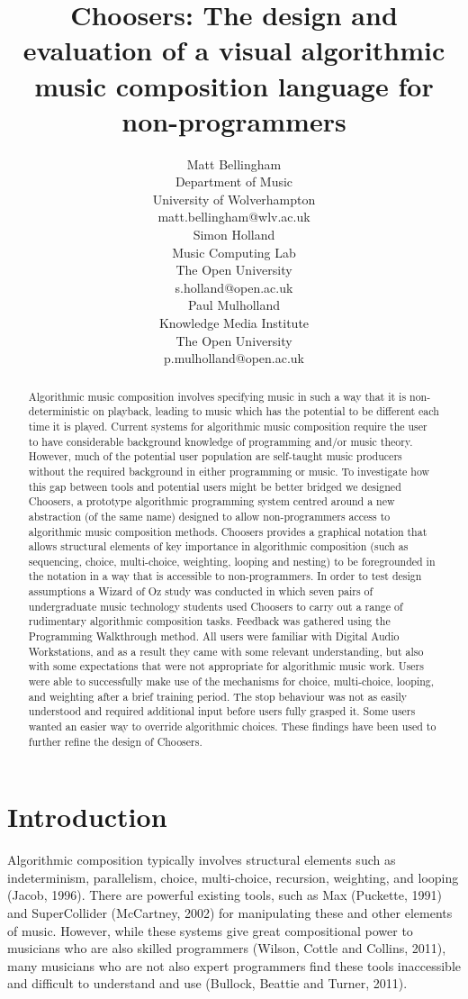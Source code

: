 \documentclass{ppig}
\title{Choosers: The design and evaluation of a visual algorithmic music
composition language for non-programmers}
\author{Matt Bellingham \\
  Department of Music \\
  University of Wolverhampton \\
  matt.bellingham@wlv.ac.uk \\
  \And
  Simon Holland \\
  Music Computing Lab \\
  The Open University \\
  s.holland@open.ac.uk \\
  \And
  Paul Mulholland\\
  Knowledge Media Institute \\
  The Open University \\
  p.mulholland@open.ac.uk}
\date{}
\begin{document}
\maketitle
\thispagestyle{empty}

\begin{abstract}
Algorithmic music composition involves specifying music in such a way
that it is non-deterministic on playback, leading to music which has the
potential to be different each time it is played. Current systems for
algorithmic music composition require the user to have considerable
background knowledge of programming and/or music theory. However, much
of the potential user population are self-taught music producers without
the required background in either programming or music. To investigate
how this gap between tools and potential users might be better bridged
we designed Choosers, a prototype algorithmic programming system centred
around a new abstraction (of the same name) designed to allow
non-programmers access to algorithmic music composition methods.
Choosers provides a graphical notation that allows structural elements
of key importance in algorithmic composition (such as sequencing,
choice, multi-choice, weighting, looping and nesting) to be foregrounded
in the notation in a way that is accessible to non-programmers. In order
to test design assumptions a Wizard of Oz study was conducted in which
seven pairs of undergraduate music technology students used Choosers to
carry out a range of rudimentary algorithmic composition tasks. Feedback
was gathered using the Programming Walkthrough method. All users were
familiar with Digital Audio Workstations, and as a result they came with
some relevant understanding, but also with some expectations that were
not appropriate for algorithmic music work. Users were able to
successfully make use of the mechanisms for choice, multi-choice,
looping, and weighting after a brief training period. The stop behaviour
was not as easily understood and required additional input before users
fully grasped it. Some users wanted an easier way to override
algorithmic choices. These findings have been used to further refine the
design of Choosers.
\end{abstract}

\hypertarget{introduction}{%
\section{Introduction}\label{introduction}}

Algorithmic composition typically involves structural elements such as
indeterminism, parallelism, choice, multi-choice, recursion, weighting,
and looping (Jacob, 1996). There are powerful existing tools, such as
Max (Puckette, 1991) and SuperCollider (McCartney, 2002) for
manipulating these and other elements of music. However, while these
systems give great compositional power to musicians who are also skilled
programmers (Wilson, Cottle and Collins, 2011), many musicians who are
not also expert programmers find these tools inaccessible and difficult
to understand and use (Bullock, Beattie and Turner, 2011).
\end{document}
